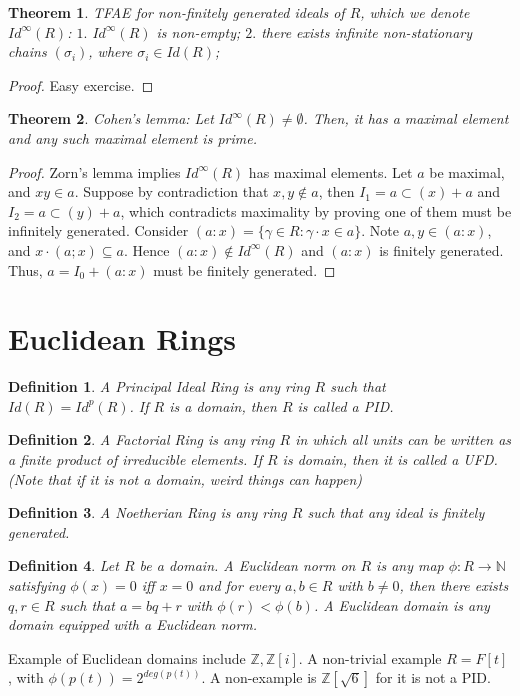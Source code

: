 \documentclass{article}
\newtheorem{theorem}{Theorem}[section]
\newtheorem{definition}{Definition}[section]
\begin{document}
\begin{theorem}
TFAE for non-finitely generated ideals of $R$, which we denote $Id^{\infty}(R)$: $1.$ $Id^{\infty}(R)$ is non-empty; $2.$ there exists infinite non-stationary chains $(\sigma_i)$, where $\sigma_i\in Id(R)$;
\end{theorem}
\begin{proof}
    Easy exercise.
\end{proof}

\begin{theorem}
Cohen's lemma: Let $Id^{\infty}(R)\neq \emptyset$. Then, it has a maximal element and any such maximal element is prime. 
\end{theorem}
\begin{proof}
    Zorn's lemma implies $Id^{\infty}(R)$ has maximal elements. Let $a$ be maximal, and $xy\in a$. Suppose by contradiction that $x,y\not \in a$, then $I_1=a\subset (x)+a$ and $I_2=a\subset (y)+a$, which contradicts maximality by proving one of them must be infinitely generated. Consider $(a:x)=\{ \gamma\in R:\gamma\cdot x\in a \}$. Note $a,y\in (a:x)$, and $x\cdot(a;x)\subseteq a$. Hence $(a:x)\not \in Id^{\infty}(R)$ and $(a:x)$ is finitely generated. Thus, $a=I_0+(a:x)$ must be finitely generated. 
\end{proof}

\section{Euclidean Rings}
\begin{definition}
    A Principal Ideal Ring is any ring $R$ such that $Id(R)=Id^p(R)$. If $R$ is a domain, then $R$ is called a PID. 
\end{definition}
\begin{definition}
    A Factorial Ring is any ring $R$ in which all units can be written as a finite product of irreducible elements. If $R$ is domain, then it is called a UFD. (Note that if it is not a domain, weird things can happen)
\end{definition}
\begin{definition}
    A Noetherian Ring is any ring $R$ such that any ideal is finitely generated. 
\end{definition}



\begin{definition}
    Let $R$ be a domain. A Euclidean norm on $R$ is any map $\phi: R\to \mathbb N$ satisfying $\phi(x)=0 $ iff $x=0$ and for every $a,b\in R$ with $b\neq 0$, then there exists $q,r\in R$ such that $a=bq+r$ with $\phi(r)<\phi(b) $. A Euclidean domain is any domain equipped with a Euclidean norm.
\end{definition}
Example of Euclidean domains include $\mathbb Z,\mathbb Z[i]$. A non-trivial example $R=F[t]$, with $\phi(p(t))=2^{deg(p(t))}$. A non-example is $\mathbb Z[\sqrt{6}]$ for it is not a PID.
\end{document}
